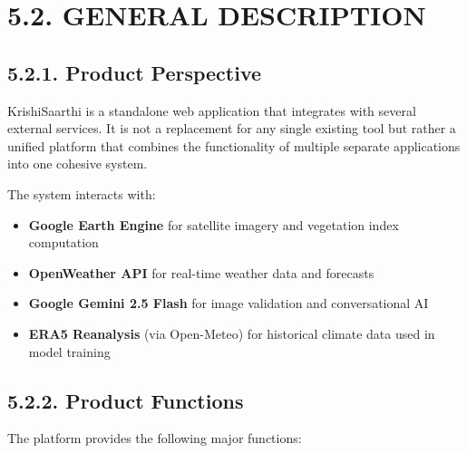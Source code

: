 \documentclass[12pt, a4paper]{report}
\begin{document}
\section{5.2. GENERAL DESCRIPTION}
\subsection{5.2.1. Product Perspective}
KrishiSaarthi is a standalone web application that integrates with several external services. It is not a replacement for any single existing tool but rather a unified platform that combines the functionality of multiple separate applications into one cohesive system.

The system interacts with:

\begin{itemize}[leftmargin=*]
  \item \textbf{Google Earth Engine} for satellite imagery and vegetation index computation
  \item \textbf{OpenWeather API} for real-time weather data and forecasts
  \item \textbf{Google Gemini 2.5 Flash} for image validation and conversational AI
  \item \textbf{ERA5 Reanalysis} (via Open-Meteo) for historical climate data used in model training
\end{itemize}
\subsection{5.2.2. Product Functions}
The platform provides the following major functions:
\end{document}
